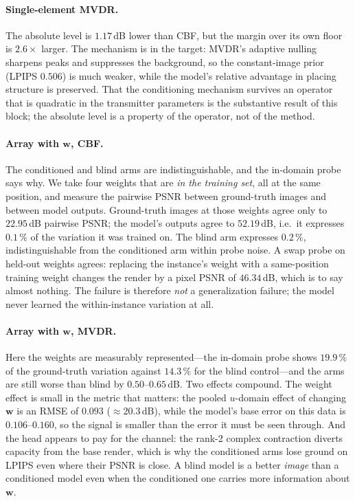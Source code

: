 \documentclass[conference]{IEEEtran}
\begin{document}
\paragraph{Single-element MVDR.} The absolute level is $1.17$\,dB lower than
CBF, but the margin over its own floor is $2.6\times$ larger. The mechanism is
in the target: MVDR's adaptive nulling sharpens peaks and suppresses the
background, so the constant-image prior (LPIPS $0.506$) is much weaker, while
the model's relative advantage in placing structure is preserved. That the
conditioning mechanism survives an operator that is quadratic in the transmitter
parameters is the substantive result of this block; the absolute level is a
property of the operator, not of the method.

\paragraph{Array with $\mathbf{w}$, CBF.} The conditioned and blind arms are
indistinguishable, and the in-domain probe says why. We take four weights that
are \emph{in the training set}, all at the same position, and measure the
pairwise PSNR between ground-truth images and between model outputs. Ground-truth
images at those weights agree only to $22.95$\,dB pairwise PSNR; the model's
outputs agree to $52.19$\,dB, i.e.\ it expresses $0.1\,\%$ of the variation it
was trained on. The blind arm expresses $0.2\,\%$, indistinguishable from the
conditioned arm within probe noise. A swap probe on held-out weights agrees: replacing the
instance's weight with a same-position training weight changes the render by a
pixel PSNR of $46.34$\,dB, which is to say almost nothing. The failure is
therefore \emph{not} a generalization failure; the model never learned the
within-instance variation at all.

\paragraph{Array with $\mathbf{w}$, MVDR.} Here the weights are measurably
represented---the in-domain probe shows $19.9\,\%$ of the ground-truth variation
against $14.3\,\%$ for the blind control---and the arms are still worse than
blind by $0.50$--$0.65$\,dB. Two effects compound. The weight effect is small in
the metric that matters: the pooled $u$-domain effect of changing $\mathbf{w}$ is
an RMSE of $0.093$ ($\approx20.3$\,dB), while the model's base error on this
data is $0.106$--$0.160$, so the signal is smaller than the error it must be
seen through. And the head appears to pay for the channel: the rank-2 complex
contraction diverts capacity from the base render, which is why the conditioned arms lose
ground on LPIPS even where their PSNR is close. A blind model is a better
\emph{image} than a conditioned model even when the conditioned one carries more
information about $\mathbf{w}$.
\end{document}
